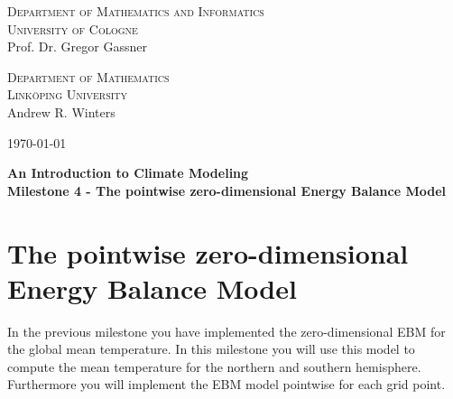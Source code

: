 \documentclass[10pt]{scrartcl}
\begin{document}
\begin{minipage}{.5\textwidth}
{\scshape Department of Mathematics and Informatics \\
University of Cologne\\}
\small Prof. Dr. Gregor Gassner \\
\end{minipage}
\begin{minipage}{.3\textwidth}
{\scshape Department of Mathematics \\
Link\"{o}ping University\\}
\small Andrew R. Winters \\
\end{minipage}
\hfill
\begin{minipage}{.15\textwidth}
\begin{flushright}
\today
\end{flushright}
\end{minipage}

\begin{center}
{\Large\bfseries
An Introduction to Climate Modeling}\\
\vspace{0.2cm}
{\bfseries Milestone 4 - The pointwise zero-dimensional Energy Balance Model}
\end{center}



\section{The pointwise zero-dimensional Energy Balance Model}
 In the previous milestone you have implemented the zero-dimensional EBM for the global mean temperature. In this milestone you will use this model to compute the mean temperature for the northern and southern hemisphere. Furthermore you will implement the EBM model pointwise for each grid point.
\end{document}
